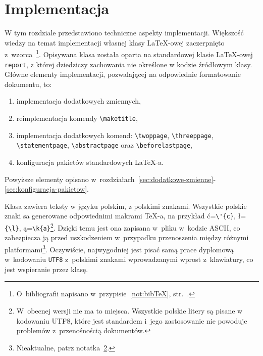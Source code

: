 \documentclass{SGGW-thesis}
\begin{document}
\chapter{Implementacja}
\label{sec:implementacja}
W tym rozdziale przedstawiono techniczne aspekty implementacji. Większość wiedzy na temat implementacji własnej klasy \LaTeX-owej zaczerpnięto z~wzorca~\cite{latexclass}\footnote{O~bibliografii napisano w~przypisie~\ref{not:bibTeX}, str.~\pageref{not:bibTeX}.}. Opisywana
klasa została oparta na standardowej klasie \LaTeX-owej \verb|report|, z której dziedziczy zachowania nie określone w kodzie źródłowym klasy. Główne elementy implementacji,
pozwalającej na odpowiednie formatowanie dokumentu, to:
\begin{enumerate} [label=\alph*.]
\item{implementacja dodatkowych zmiennych,}
\item{reimplementacja komendy \verb|\maketitle|,}
\item{implementacja dodatkowych komend: \verb|\twoppage|, \verb|\threeppage|,
\linebreak \verb|\statementpage|, \verb|\abstractpage| oraz \verb|\beforelastpage|,}\label{itm:implementacja}
\item{konfiguracja pakietów standardowych \LaTeX-a.}
\end{enumerate}
Powyższe elementy opisano w~rozdziałach~\ref{sec:dodatkowe-zmienne}-\ref{sec:konfiguracja-pakietow}.

Klasa zawiera teksty w języku polskim, z polskimi znakami. Wszystkie polskie znaki sa generowane odpowiednimi makrami \TeX-a, na przykład  ć=\verb|\'{c}|, ł=\verb|{\l}|,
ą=\verb|\k{a}|\footnote{\label{not:UTF8}W~obecnej wersji nie ma to miejsca. Wszystkie polskie litery są pisane w kodowaniu UTF8, które jest standardem i~jego zastosowanie nie powoduje problemów z~przenośnością dokumentów.}. Dzięki temu jest ona zapisana w~pliku w~kodzie ASCII, co zabezpiecza ją przed uszkodzeniem w~przypadku przenoszenia między różnymi platformami\footnote{Nieaktualne, patrz notatka~\ref{not:UTF8}.}. Oczywiście, najwygodniej jest pisać samą prace dyplomową w~kodowaniu {\tt UTF8} z~polskimi znakami wprowadzanymi wprost z~klawiatury, co jest wspieranie przez klasę.
\end{document}
